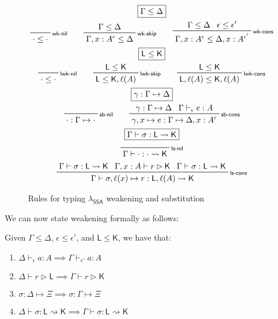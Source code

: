\documentclass[acmsmall,screen,review]{acmart}
\newcounter{todos}
\newcommand{\todo}[1]{\stepcounter{todos} \textcolor{red}{TODO \arabic{todos}: #1}}
\newcommand{\ms}[1]{\ensuremath{\mathsf{#1}}}
\newcommand{\thyp}[3]{#1 : {#2}^{#3}}
\newcommand{\bhyp}[2]{#1 : #2}
\newcommand{\lhyp}[2]{#1(#2)}
\newcommand{\rle}[1]{{\scriptsize\textsf{#1}}}
\newcommand{\hasty}[4]{#1 \vdash_{#2} #3: {#4}}
\newcommand{\haslb}[3]{#1 \vdash #2 \rhd #3}
\newcommand{\issubst}[3]{#1: #2 \mapsto #3}
\newcommand{\lbsubst}[4]{#1 \vdash #2: #3 \rightsquigarrow #4}
\newcommand{\isotopessa}{\(\lambda_{\ms{SSA}}\)}
\begin{document}
\begin{figure}
  \begin{gather*}
    \boxed{\Gamma \leq \Delta} \\
    \prftree[r]{\rle{wk-nil}}{}{\cdot \leq \cdot} \qquad
    \prftree[r]{\rle{wk-skip}}{\Gamma \leq \Delta}{\Gamma, \thyp{x}{A}{\epsilon} \leq \Delta} \qquad
    \prftree[r]{\rle{wk-cons}}{\Gamma \leq \Delta}{\epsilon \leq \epsilon'}
      {\Gamma, \thyp{x}{A}{\epsilon} \leq \Delta, \thyp{x}{A}{\epsilon'}} \\
    \boxed{\ms{L} \leq \ms{K}} \\
    \prftree[r]{\rle{lwk-nil}}{}{\cdot \leq \cdot} \qquad
    \prftree[r]{\rle{lwk-skip}}{\ms{L} \leq \ms{K}}{\ms{L} \leq \ms{K}, \lhyp{\ell}{A}} \qquad
    \prftree[r]{\rle{lwk-cons}}{\ms{L} \leq \ms{K}}
      {\ms{L}, \lhyp{\ell}{A} \leq \ms{K}, \lhyp{\ell}{A}} \\
    \boxed{\issubst{\gamma}{\Gamma}{\Delta}} \\
    \prftree[r]{\rle{sb-nil}}{}{\issubst{\cdot}{\Gamma}{\cdot}} \qquad
    \prftree[r]{\rle{sb-cons}}{\issubst{\gamma}{\Gamma}{\Delta}}{\hasty{\Gamma}{\epsilon}{e}{A}}
      {\issubst{\gamma, x \mapsto e}{\Gamma}{\Delta, \thyp{x}{A}{\epsilon}}}
       \\
    \boxed{\lbsubst{\Gamma}{\sigma}{\ms{L}}{\ms{K}}} \\
    \prftree[r]{\rle{ls-nil}}{}{\lbsubst{\Gamma}{\cdot}{\cdot}{\ms{K}}}
    \\
    \prftree[r]{\rle{ls-cons}}
      {\lbsubst{\Gamma}{\sigma}{\ms{L}}{\ms{K}}}{\haslb{\Gamma, \bhyp{x}{A}}{r}{\ms{K}}}
      {\lbsubst{\Gamma}{\sigma}{\ms{L}}{\ms{K}}}
      {\lbsubst{\Gamma}{\sigma, \ell(x) \mapsto r}{\ms{L}, \lhyp{\ell}{A}}{\ms{K}}}
  \end{gather*}
  \caption{Rules for typing \isotopessa{} weakening and substitution}
  \Description{}
  \label{fig:ssa-meta-rules}
\end{figure}

We can now state weakening formally as follows:
\begin{lemma}[Weakening]
  Given $\Gamma \leq \Delta$, $\epsilon \leq \epsilon'$, and $\ms{L} \leq \ms{K}$, we have that:
  \begin{enumerate}[label=(\alph*)]
    \item $\hasty{\Delta}{\epsilon}{a}{A} \implies \hasty{\Gamma}{\epsilon'}{a}{A}$
    \item $\haslb{\Delta}{r}{\ms{L}} \implies \haslb{\Gamma}{r}{\ms{K}}$
    \item $\issubst{\sigma}{\Delta}{\Xi} \implies \issubst{\sigma}{\Gamma}{\Xi}$
    \item $\lbsubst{\Delta}{\sigma}{\ms{L}}{\ms{K}} \implies \lbsubst{\Gamma}{\sigma}{\ms{L}}{\ms{K}}$
  \end{enumerate}
\end{lemma}
\end{document}
